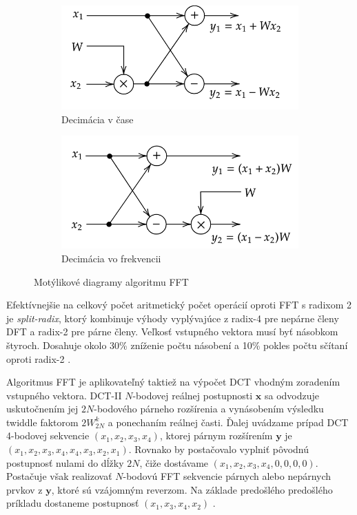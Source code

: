 \begin{figure}[h]
\centering
\begin{subfigure}[b]{0.48\textwidth}
    \centering
    \includegraphics[width=\textwidth]{figures/analysis/dit-butterfly.png}
    \caption{Decimácia v čase}
    \label{fig:dit-butterfly}
\end{subfigure}
\hfill
\begin{subfigure}[b]{0.48\textwidth}
    \centering
    \includegraphics[width=\textwidth]{figures/analysis/dif-butterfly.png}
    \caption{Decimácia vo frekvencii}
    \label{fig:dif-butterfly}
\end{subfigure}
\caption{Motýlikové diagramy algoritmu FFT}
\end{figure}

Efektívnejšie na celkový počet aritmetický počet operácií oproti FFT s radixom 2 je \emph{split-radix}, ktorý
kombinuje výhody vyplývajúce z radix-4 pre nepárne členy DFT a radix-2 pre párne členy. Veľkosť vstupného
vektora musí byť násobkom štyroch. Dosahuje okolo 30\% zníženie počtu násobení a 10\% pokles počtu sčítaní
oproti radix-2 \cite{split-radix}.

Algoritmus FFT je aplikovateľný taktiež na výpočet DCT vhodným zoradením vstupného vektora. DCT-II $N$-bodovej
reálnej postupnosti $\mathbf{x}$ sa odvodzuje uskutočnením jej $2N$-bodového párneho rozšírenia a vynásobením výsledku
twiddle faktorom $2W_{2N}^{k}$ a ponechaním reálnej časti. Ďalej uvádzame prípad
DCT 4-bodovej sekvencie $(x_1, x_2, x_3, x_4)$, ktorej párnym rozšírením $\mathbf{y}$ je 
$(x_1, x_2, x_3, x_4, x_4, x_3, x_2, x_1)$.
Rovnako by postačovalo vyplniť pôvodnú postupnosť nulami do dĺžky $2N$, čiže dostávame $(x_1, x_2, x_3, x_4, 0, 0, 0, 0)$.
Postačuje však realizovať $N$-bodovú FFT sekvencie párnych alebo nepárnych prvkov z $\mathbf{y}$, ktoré sú vzájomným reverzom.
Na základe predošlého predošlého príkladu dostaneme postupnosť $(x_1, x_3, x_4, x_2)$ \cite{fast-dct}.

